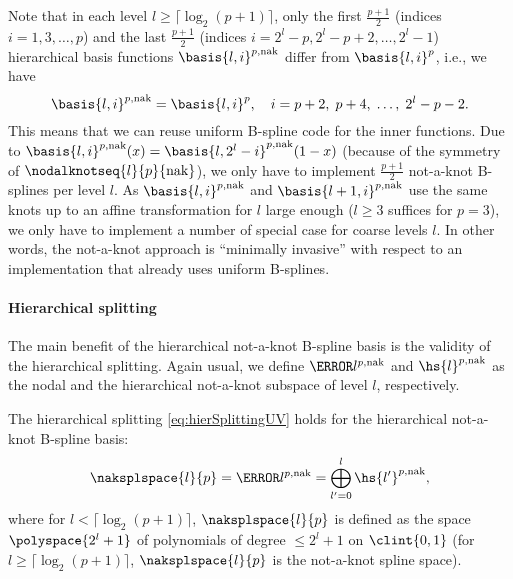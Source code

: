 Note that in each level $l \ge \lceil\log_2(p+1)\rceil$,
only the first $\tfrac{p+1}{2}$
(indices $i = 1, 3, \dotsc, p$)
and the last $\tfrac{p+1}{2}$
(indices $i = 2^l - p, 2^l - p + 2, \dotsc, 2^l - 1$)
hierarchical basis functions $\basis{l,i}^{p,\notaknot}$
differ from $\basis{l,i}^p$,
i.e., we have
\begin{equation}
  \basis{l,i}^{p,\notaknot} = \basis{l,i}^p,\quad
  i = p + 2,\; p + 4,\; \dotsc,\; 2^l - p - 2.
\end{equation}
This means that we can reuse uniform B-spline code
for the inner functions.
Due to $\basis{l,i}^{p,\notaknot}(x) = \basis{l,2^l-i}^{p,\notaknot}(1-x)$
(because of the symmetry of $\nodalknotseq{l}{p}{\notaknot}$),
we only have to implement $\tfrac{p+1}{2}$ not-a-knot B-splines per level $l$.
As $\basis{l,i}^{p,\notaknot}$ and $\basis{l+1,i}^{p,\notaknot}$
use the same knots up to an affine transformation for $l$ large enough
($l \ge 3$ suffices for $p = 3$),
we only have to implement a number of special case for coarse levels $l$.
In other words, the not-a-knot approach is ``minimally invasive''
with respect to an implementation that already uses uniform B-splines.

\paragraph{Hierarchical splitting}

The main benefit of the hierarchical not-a-knot B-spline basis
is the validity of the hierarchical splitting.
Again usual, we define $\ns{l}^{p,\notaknot}$ and $\hs{l}^{p,\notaknot}$
as the nodal and the hierarchical not-a-knot subspace of level $l$,
respectively.

\begin{proposition}
  \label{prop:hierSplittingNAKBSplineUV}
  The hierarchical splitting \eqref{eq:hierSplittingUV}
  holds for the hierarchical not-a-knot B-spline basis:
  \begin{equation}
    \naksplspace{l}{p}
    = \ns{l}^{p,\notaknot}
    = \bigoplus_{l'=0}^l \hs{l'}^{p,\notaknot},
  \end{equation}
  where for $l < \lceil\log_2(p+1)\rceil$, $\naksplspace{l}{p}$
  is defined as the space $\polyspace{2^l + 1}$ of polynomials of degree
  $\le 2^l + 1$ on $\clint{0, 1}$
  (for $l \ge \lceil\log_2(p+1)\rceil$,
  $\naksplspace{l}{p}$ is the not-a-knot spline space).
\end{proposition}

